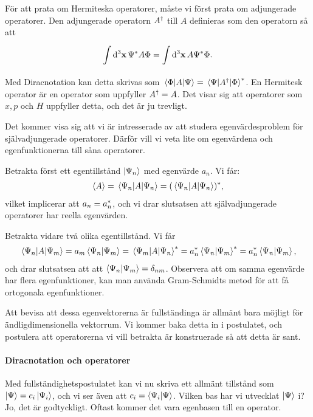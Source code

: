 För att prata om Hermiteska operatorer, måste vi först prata om adjungerade operatorer. Den adjungerade operatorn $A^{\dagger}$ till $A$ definieras som den operatorn så att
\begin{align*}
	\int\limits_{}^{}\dd[3]{\vb{x}}\Psi^{*}A\Phi = \int\limits_{}^{}\dd[3]{\vb{x}}A\Psi^{*}\Phi.
\end{align*}
Med Diracnotation kan detta skrivas som $\mel{\Phi}{A}{\Psi} = \mel{\Psi}{A^{\dagger}}{\Phi}^{*}$. En Hermitesk operator är en operator som uppfyller $A^{\dagger} = A$. Det visar sig att operatorer som $x, p$ och $H$ uppfyller detta, och det är ju trevligt.



Det kommer visa sig att vi är intresserade av att studera egenvärdesproblem för självadjungerade operatorer. Därför vill vi veta lite om egenvärdena och egenfunktionerna till såna operatorer.

Betrakta först ett egentillstånd $\ket{\Psi_{n}}$ med egenvärde $a_{n}$. Vi får:
\begin{align*}
	\expval{A} = \expval{A}{\Psi_{n}} = (\expval{A}{\Psi_{n}})^{*},
\end{align*}
vilket implicerar att $a_{n} = a_{n}^{*}$, och vi drar slutsatsen att självadjungerade operatorer har reella egenvärden.

Betrakta vidare två olika egentillstånd. Vi får
\begin{align*}
	\mel{\Psi_{n}}{A}{\Psi_{m}} = a_{m}\braket{\Psi_{n}}{\Psi_{m}} = \mel{\Psi_{m}}{A}{\Psi_{n}}^{*} = a_{n}^{*}\braket{\Psi_{n}}{\Psi_{m}}^{*} = a_{n}^{*}\braket{\Psi_{n}}{\Psi_{m}},
\end{align*}
och drar slutsatsen att att $\braket{\Psi_{n}}{\Psi_{m}} = \delta_{nm}$. Observera att om samma egenvärde har flera egenfunktioner, kan man använda Gram-Schmidts metod för att få ortogonala egenfunktioner.

Att bevisa att dessa egenvektorerna är fullständinga är allmänt bara möjligt för ändligdimensionella vektorrum. Vi kommer baka detta in i postulatet, och postulera att operatorerna vi vill betrakta är konstruerade så att detta är sant.

\paragraph{Diracnotation och operatorer}
Med fullständighetspostulatet kan vi nu skriva ett allmänt tillstånd som $\ket{\Psi} = c_{i}\ket{\Psi_{i}}$, och vi ser även att $c_{i} = \braket{\Psi_{i}}{\Psi}$. Vilken bas har vi utvecklat $\ket{\Psi}$ i? Jo, det är godtyckligt. Oftast kommer det vara egenbasen till en operator.

